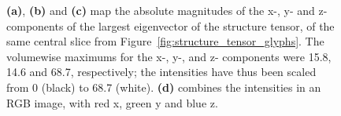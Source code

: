     \begin{figure}[htbp]
      \centering
      \caption{\textbf{(a)}, \textbf{(b)} and \textbf{(c)} map the absolute magnitudes of the x-, y- and z- components of the largest eigenvector of the structure tensor, of the same central slice from Figure~\ref{fig:structure_tensor_glyphs}. The volumewise maximums for the x-, y-, and z- components were 15.8, 14.6 and 68.7, respectively; the intensities have thus been scaled from 0 (black) to 68.7 (white). \textbf{(d)} combines the intensities in an RGB image, with red x, green y and blue z.}
      \label{fig:eigencomponents}
    \end{figure}
    
